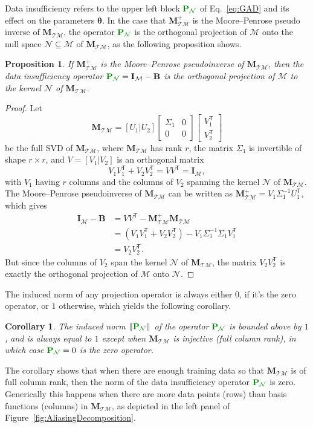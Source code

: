 \documentclass[twocolumn,aps,prx,superscriptaddress,10pt]{revtex4-2}
\newcommand{\0}{\bm{0}}
\newcommand{\btheta}{\boldsymbol{\theta}}
\newcommand{\M}{\mathcal{M}} %
\newcommand{\K}{\mathcal{N}} %
\newcommand{\T}{\mathcal{T}} %
\newcommand{\bbPN}{{\color{Green}{\mathbf{P}_{\K}}}} %
\newcommand{\bbB}{\mathbf{B}}
\newcommand{\bbI}{\mathbf{I}}
\newcommand{\bbM}{\mathbf{M}}
\newcommand{\MTM}{\bbM_{\T\M}}
\newcommand{\trp}{^{\mathsf{T}}}  %
\newtheorem{corollary}[theorem]{Corollary}
\newtheorem{proposition}[theorem]{Proposition}
\begin{document}
Data insufficiency refers to the upper left block $\bbPN$ of Eq.~\eqref{eq:GAD} and its effect on the parameters $\btheta$.
In the case that $\MTM^+$ is the Moore--Penrose pseudo inverse of $\MTM$, the operator $\bbPN$ is the orthogonal projection of $\M$ onto the null space $\K \subseteq \M$ of $\MTM$, as the following proposition shows.
\begin{proposition}\label{prop:DI-is-projection}
If $\MTM^+$ is the Moore--Penrose pseudoinverse of $\MTM$, then the data insufficiency operator $\bbPN = \bbI_\M - \bbB$ is the orthogonal projection of $\M$ to the kernel $\K$ of $\MTM$.
\end{proposition}
\begin{proof}
Let 
\[
\MTM = [U_1 | U_2] 
    \begin{bmatrix}
    \Sigma_1 & 0 \\
    0        & 0
    \end{bmatrix}
\begin{bmatrix}
    V_1\trp\\
    V_2\trp
\end{bmatrix}
\] be the full SVD of $\MTM$, where $\MTM$ has rank $r$, the matrix $\Sigma_1$ is invertible of shape $r\times r$, and $V = [V_1 | V_2]$ is an orthogonal matrix 
\[
V_1 V_1\trp + V_2 V_2\trp = V V\trp = \bbI_{\M},
\]
with $V_1$ having $r$ columns and the columns of $V_2$ spanning the kernel $\K$ of $\MTM$. 
The Moore--Penrose pseudoinverse of $\MTM$ can be written as 
$\MTM^+ = V_1 \Sigma_1^{-1} U_1\trp$, which gives  
\begin{align*}
\bbI_\M - \bbB & = V V\trp - \MTM^+ \MTM\\
& = (V_1 V_1\trp + V_2 V_2\trp) - V_1 \Sigma_1^{-1} \Sigma_1 V_1\trp\\
& = V_2 V_2\trp.
\end{align*}
But since the columns of $V_2$ span the kernel $\K$ of $\MTM$, the matrix $V_2 V_2\trp$ is exactly the orthogonal projection of $\M$ onto  $\K$.
\end{proof}
The induced norm of any projection operator is always either $0$, if it's the zero operator, or
$1$ otherwise, which yields the following corollary.
\begin{corollary}
    The induced norm $\|\bbPN\|$ of the operator $\bbPN$ is bounded above by $1$, and is always equal to $1$ except when $\MTM$ is injective (full column rank), in which case $\bbPN = 0$ is the zero operator.
\end{corollary}
The corollary shows that when there are enough  training data so that $\MTM$ is of full column rank, then the norm of the data insufficiency operator $\bbPN$ is zero. Generically this happens when there are more data points (rows) than basis functions (columns) in $\MTM$,  as depicted in the left panel of Figure~\ref{fig:AliasingDecomposition}.
\end{document}
